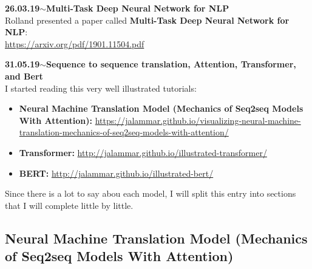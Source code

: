 \documentclass[11pt,a4paper]{article}
\newenvironment{loggentry}[2]%
{\noindent\textbf{#1}\hspace{1cm}$\mathbf{\sim}$\text{ }\textbf{#2}\\}{\vspace{0.5cm}}
\begin{document}
\begin{loggentry}{26.03.19}{Multi-Task Deep Neural Network for NLP}

Rolland presented a paper called \textbf{Multi-Task Deep Neural Network for NLP}:\\
\url{https://arxiv.org/pdf/1901.11504.pdf}\\

\end{loggentry}


\begin{loggentry}{31.05.19}{Sequence to sequence translation, Attention, Transformer, and Bert}

I started reading this very well illustrated tutorials:
\begin{itemize}
\item \textbf{Neural Machine Translation Model (Mechanics of Seq2seq Models With Attention):} \url{https://jalammar.github.io/visualizing-neural-machine-translation-mechanics-of-seq2seq-models-with-attention/}
\item \textbf{Transformer:} \url{http://jalammar.github.io/illustrated-transformer/}
\item \textbf{BERT:} \url{http://jalammar.github.io/illustrated-bert/}
\end{itemize}

Since there is a lot to say abou each model, I will split this entry into sections that I will complete little by little.


\subsection{Neural Machine Translation Model (Mechanics of Seq2seq Models With Attention)}


\end{loggentry}
\end{document}
